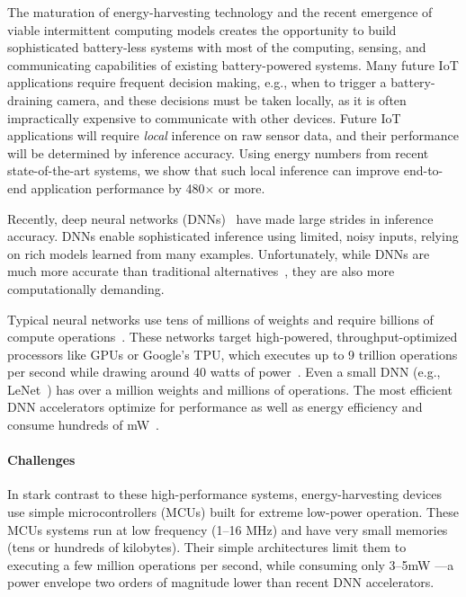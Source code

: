 The maturation of energy-harvesting technology and the recent
emergence of viable intermittent computing models creates the
opportunity to build sophisticated battery-less systems with most of
the computing, sensing, and communicating capabilities of existing
battery-powered systems.
%
Many future IoT applications require frequent decision making, e.g.,
when to trigger a battery-draining camera,
%
and these decisions must be taken locally,
as it is often impractically expensive %
to communicate with other devices.
%
Future IoT applications will require {\em local} inference on raw sensor data,
and their performance will be determined by inference accuracy. Using energy
numbers from recent state-of-the-art systems, we show that such local inference
can improve end-to-end application performance by 480$\times$ or more.

Recently, deep neural networks (DNNs)~\cite{alexnet, vgg, googlenet} have made
large strides in inference accuracy.
%
DNNs enable sophisticated inference using limited, noisy inputs, relying on
rich models learned from many examples.
%
Unfortunately, while DNNs are much more accurate than traditional
alternatives~\cite{gupta2017protonn, Mitchell:1997:ML:541177}, they are also
more computationally demanding.

Typical neural networks use tens of millions of weights and require
billions of compute operations~\cite{vgg,googlenet,alexnet}.
%
These networks target high-powered,
throughput-optimized processors like GPUs or Google's TPU, which
executes up to 9 trillion operations per second while drawing around
40 watts of power~\cite{jouppi:isca17:tpu}.
%
Even a small DNN (e.g., LeNet~\cite{lecun:ieee89:lenet}) has over a million
weights and millions of operations.
%
The most efficient DNN accelerators optimize for performance as
well as energy efficiency and consume hundreds of
mW~\cite{han:isca16:eie,chen:asplos14:diannao,du:isca15:shidiannao,chen:isca16:eyeriss}.

\paragraph{Challenges}
%
In stark contrast to these high-performance systems, energy-harvesting devices
use simple microcontrollers (MCUs) built for extreme low-power operation.
These MCUs systems run at low frequency (1--16 MHz) and have very small
memories (tens or hundreds of kilobytes).
%
Their simple architectures limit them to executing a few 
million operations per second, while consuming only 3--5mW%
---a power envelope two orders of magnitude lower than recent DNN accelerators.

